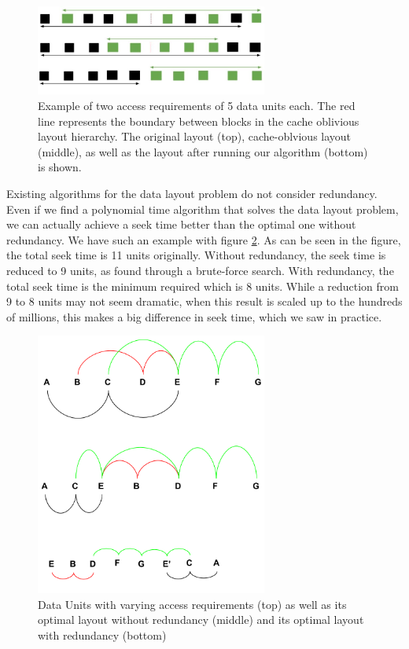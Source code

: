 \documentclass[conference]{acmsiggraph}
\begin{document}
\begin{figure}[ht]
\centering
\includegraphics[width=3in]{ImprovementOverYoon.jpg}
\caption{Example of two access requirements of 5 data units each. The red line represents the boundary between blocks in the cache oblivious layout hierarchy. The original layout (top), cache-oblvious layout (middle), as well as the layout after running our algorithm (bottom) is shown.}
\label{YoonImprovement}
\end{figure}

Existing algorithms for the data layout problem do not consider redundancy. Even if we find a polynomial time algorithm that solves the data layout problem, we can actually achieve a seek time better than the optimal one without redundancy. We have such an example with figure \ref{fig:startingProb}. As can be seen in the figure, the total seek time is 11 units originally. Without redundancy, the seek time is reduced to 9 units, as found through a brute-force search. With redundancy, the total seek time is the minimum required which is 8 units. While a reduction from 9 to 8 units may not seem dramatic, when this result is scaled up to the hundreds of millions, this makes a big difference in seek time, which we saw in practice.\\

\begin{figure}[ht]
\centering
\includegraphics[width=3in]{examplePic.png}
\caption{Data Units with varying access requirements (top) as well as its optimal layout without redundancy (middle) and its optimal layout with redundancy (bottom)}
\label{fig:startingProb}
\end{figure}
\end{document}
